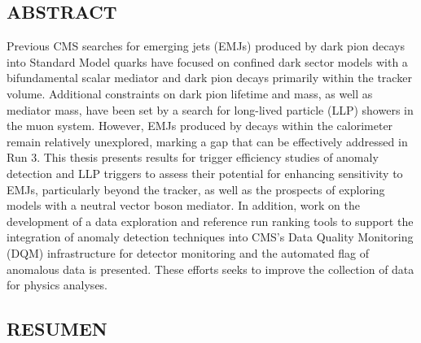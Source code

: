 



\vspace*{0.5in}
\begin{center}
	\section*{ABSTRACT}
\end{center}

\noindent
Previous CMS searches for emerging jets (EMJs) produced by dark pion decays into Standard Model quarks have focused on confined dark sector models with a bifundamental scalar mediator and dark pion decays primarily within the tracker volume. Additional constraints on dark pion lifetime and mass, as well as mediator mass, have been set by a search for long-lived particle (LLP) showers in the muon system. However, EMJs produced by decays within the calorimeter remain relatively unexplored, marking a gap that can be effectively addressed in Run 3. This thesis presents results for trigger efficiency studies of anomaly detection and LLP triggers to assess their potential for enhancing sensitivity to EMJs, particularly beyond the tracker, as well as the prospects of exploring models with a neutral vector boson mediator. In addition, work on the development of a data exploration and reference run ranking tools to support the integration of anomaly detection techniques into CMS's Data Quality Monitoring (DQM) infrastructure for detector monitoring and the automated flag of anomalous data is presented. These efforts seeks to improve the collection of data for physics analyses.







\newpage





\vspace*{0.5in}
\begin{center}
	\section*{RESUMEN}
\end{center}

